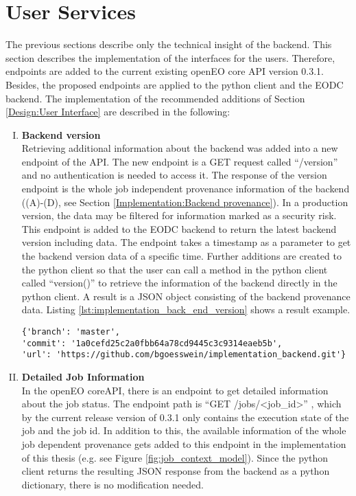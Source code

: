 \documentclass[draft,final]{vutinfth} %
\begin{document}
\section{User Services}\label{Implementation:User Interface}
The previous sections describe only the technical insight of the backend. This section describes the implementation of the interfaces for the users. Therefore, endpoints are added to the current existing openEO core API version 0.3.1. Besides, the proposed endpoints are applied to the python client and the EODC backend. The implementation of the recommended additions of Section \ref{Design:User Interface} are described in the following:
\begin{enumerate}[I.]
\item \textbf{Backend version} \\
	Retrieving additional information about the backend was added into a new endpoint of the API. The new endpoint is a GET request called “/version” and no authentication is needed to access it. The response of the version endpoint is the whole job independent provenance information of the backend ((A)-(D), see Section \ref{Implementation:Backend provenance}). In a production version, the data may be filtered for information marked as a security risk. This endpoint is added to the EODC backend to return the latest backend version including data. The endpoint takes a timestamp as a parameter to get the backend version data of a specific time. Further additions are created to the python client so that the user can call a method in the python client called “version()” to retrieve the information of the backend directly in the python client. A result is a JSON object consisting of the backend provenance data. Listing \ref{lst:implementation_back_end_version} shows a result example.

\begin{listing}[ht]
	\begin{verbatim}
{'branch': 'master',
'commit': '1a0cefd25c2a0fbb64a78cd9445c3c9314eaeb5b',
'url': 'https://github.com/bgoesswein/implementation_backend.git'}
	\end{verbatim}
	\caption{Backend version example.}
	\label{lst:implementation_back_end_version}
\end{listing}

\item \textbf{Detailed Job Information} \\
	In the openEO coreAPI, there is an endpoint to get detailed information about the job status. The endpoint path is “GET /jobs/<job\_id>” , which by the current release version of 0.3.1 only contains the execution state of the job and the job id. In addition to this, the available information of the whole job dependent provenance gets added to this endpoint in the implementation of this thesis (e.g. see Figure \ref{fig:job_context_model}). Since the python client returns the resulting JSON response from the backend as a python dictionary, there is no modification needed.


\end{enumerate}
\end{document}
